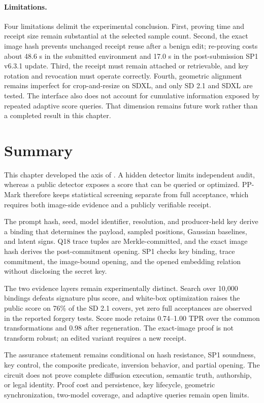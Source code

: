\paragraph{Limitations.}
Four limitations delimit the experimental conclusion.  First, proving time and
receipt size remain substantial at the selected sample count.  Second, the exact
image hash prevents unchanged receipt reuse after a benign edit; re-proving costs
about 48.6 s in the submitted environment and 17.0 s in the post-submission SP1
v6.3.1 update.  Third, the receipt must remain
attached or retrievable, and key rotation and revocation must operate correctly.
Fourth, geometric alignment remains imperfect for crop-and-resize on SDXL, and
only SD 2.1 and SDXL are tested.  The interface also does not account for
cumulative information exposed by repeated adaptive score queries.  That
dimension remains future work rather than a completed result in this chapter.

\section{Summary}
\label{sec:ch4-summary}

This chapter developed the \SecurePublicVerification{} axis of
\ClaimAlignedAssurance{}.  A hidden detector limits independent audit, whereas a
public detector exposes a score that can be queried or optimized.  PP-Mark
therefore keeps statistical screening separate from full acceptance, which
requires both image-side evidence and a publicly verifiable receipt.

The prompt hash, seed, model identifier, resolution, and producer-held key derive
a binding that determines the payload, sampled positions, Gaussian baselines, and
latent signs.  Q18 trace tuples are Merkle-committed, and the exact image hash
derives the post-commitment opening.  SP1 checks key binding, trace commitment,
the image-bound opening, and the opened embedding relation without disclosing the
secret key.

The two evidence layers remain experimentally distinct.  Search over 10,000
bindings defeats signature plus score, and white-box optimization raises the
public score on 76\% of the SD 2.1 covers, yet zero full acceptances are observed
in the reported forgery tests.  Score mode retains 0.74--1.00 TPR over the common
transformations and 0.98 after regeneration.  The exact-image proof is not
transform robust; an edited variant requires a new receipt.

The assurance statement remains conditional on hash resistance, SP1 soundness,
key control, the composite predicate, inversion behavior, and partial opening.
The circuit does not prove complete diffusion execution, semantic truth,
authorship, or legal identity.  Proof cost and persistence, key lifecycle,
geometric synchronization, two-model coverage, and adaptive queries remain
open limits.

